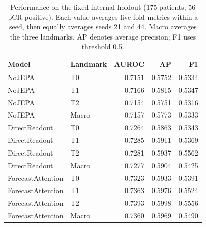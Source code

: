 \begin{table}[t]
\centering
\small
\caption{Performance on the fixed internal holdout (175 patients, 56 pCR positive). Each value averages five fold metrics within a seed, then equally averages seeds 21 and 44. Macro averages the three landmarks. AP denotes average precision; F1 uses threshold 0.5.}
\label{tab:main}
\begin{tabular}{llrrr}
\toprule
Model & Landmark & AUROC & AP & F1 \\
\midrule
NoJEPA & T0 & 0.7151 & 0.5752 & 0.5334 \\
NoJEPA & T1 & 0.7166 & 0.5815 & 0.5347 \\
NoJEPA & T2 & 0.7154 & 0.5751 & 0.5316 \\
NoJEPA & Macro & 0.7157 & 0.5773 & 0.5333 \\
DirectReadout & T0 & 0.7264 & 0.5863 & 0.5343 \\
DirectReadout & T1 & 0.7285 & 0.5911 & 0.5369 \\
DirectReadout & T2 & 0.7281 & 0.5937 & 0.5562 \\
DirectReadout & Macro & 0.7277 & 0.5904 & 0.5425 \\
ForecastAttention & T0 & 0.7323 & 0.5933 & 0.5391 \\
ForecastAttention & T1 & 0.7363 & 0.5976 & 0.5524 \\
ForecastAttention & T2 & 0.7393 & 0.5998 & 0.5556 \\
ForecastAttention & Macro & 0.7360 & 0.5969 & 0.5490 \\
\bottomrule
\end{tabular}
\end{table}

